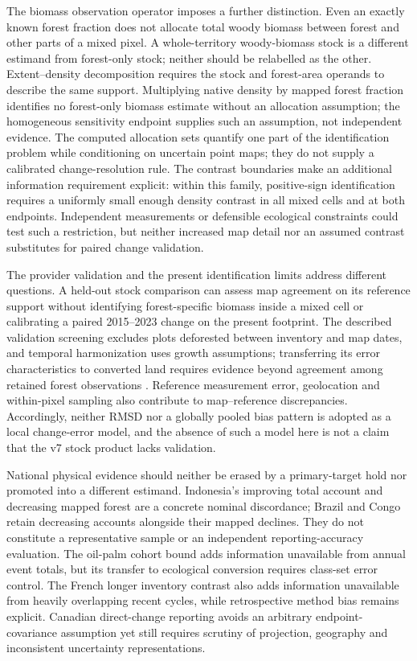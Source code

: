 \documentclass[11pt,a4paper]{article}
\begin{document}
The biomass observation operator imposes a further distinction. Even an exactly known forest fraction does not allocate total woody biomass between forest and other parts of a mixed pixel. A whole-territory woody-biomass stock is a different estimand from forest-only stock; neither should be relabelled as the other. Extent--density decomposition requires the stock and forest-area operands to describe the same support. Multiplying native density by mapped forest fraction identifies no forest-only biomass estimate without an allocation assumption; the homogeneous sensitivity endpoint supplies such an assumption, not independent evidence. The computed allocation sets quantify one part of the identification problem while conditioning on uncertain point maps; they do not supply a calibrated change-resolution rule. The contrast boundaries make an additional information requirement explicit: within this family, positive-sign identification requires a uniformly small enough density contrast in all mixed cells and at both endpoints. Independent measurements or defensible ecological constraints could test such a restriction, but neither increased map detail nor an assumed contrast substitutes for paired change validation.

The provider validation and the present identification limits address different questions. A held-out stock comparison can assess map agreement on its reference support without identifying forest-specific biomass inside a mixed cell or calibrating a paired 2015--2023 change on the present footprint. The described validation screening excludes plots deforested between inventory and map dates, and temporal harmonization uses growth assumptions; transferring its error characteristics to converted land requires evidence beyond agreement among retained forest observations \citep[pp.~13, 18--19]{PVIR2026}. Reference measurement error, geolocation and within-pixel sampling also contribute to map--reference discrepancies. Accordingly, neither RMSD nor a globally pooled bias pattern is adopted as a local change-error model, and the absence of such a model here is not a claim that the v7 stock product lacks validation.

National physical evidence should neither be erased by a primary-target hold nor promoted into a different estimand. Indonesia's improving total account and decreasing mapped forest are a concrete nominal discordance; Brazil and Congo retain decreasing accounts alongside their mapped declines. They do not constitute a representative sample or an independent reporting-accuracy evaluation. The oil-palm cohort bound adds information unavailable from annual event totals, but its transfer to ecological conversion requires class-set error control. The French longer inventory contrast also adds information unavailable from heavily overlapping recent cycles, while retrospective method bias remains explicit. Canadian direct-change reporting avoids an arbitrary endpoint-covariance assumption yet still requires scrutiny of projection, geography and inconsistent uncertainty representations.
\end{document}
